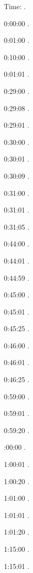 
Time: \DTMcurrenttime.

0:00:00 .

0:01:00 . 

0:10:00 . 

0:01:01 . 

0:29:00 . 

0:29:08 . 

0:29:01 . 

0:30:00 .

0:30:01 .

0:30:09 .

0:31:00 .

0:31:01 .

0:31:05 .

0:44:00 .

0:44:01 .

0:44:59 .

0:45:00 .

0:45:01 .

0:45:25 .

0:46:00 .

0:46:01 .

0:46:25 .

0:59:00 .

0:59:01 .

0:59:20 .

:00:00 .

1:00:01 . 

1:00:20 .

1:01:00 . 

1:01:01 .

1:01:20 . 

1:15:00 . 

1:15:01 . 

